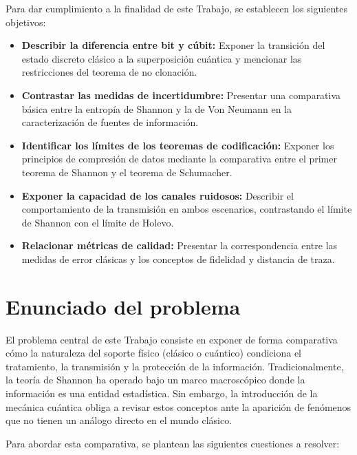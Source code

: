 \documentclass[11pt,a4paper,spanish]{book}
\begin{document}
Para dar cumplimiento a la finalidad de este Trabajo, se establecen los siguientes objetivos:

\begin{itemize}
    \item \textbf{Describir la diferencia entre bit y cúbit:} Exponer la transición del estado discreto clásico a la superposición cuántica y mencionar las restricciones del teorema de no clonación.
    \item \textbf{Contrastar las medidas de incertidumbre:} Presentar una comparativa básica entre la entropía de Shannon y la de Von Neumann en la caracterización de fuentes de información.
    \item \textbf{Identificar los límites de los teoremas de codificación:} Exponer los principios de compresión de datos mediante la comparativa entre el primer teorema de Shannon y el teorema de Schumacher.
    \item \textbf{Exponer la capacidad de los canales ruidosos:} Describir el comportamiento de la transmisión en ambos escenarios, contrastando el límite de Shannon con el límite de Holevo.
    \item \textbf{Relacionar métricas de calidad:} Presentar la correspondencia entre las medidas de error clásicas y los conceptos de fidelidad y distancia de traza.
\end{itemize}

\chapter{Enunciado del problema}

El problema central de este Trabajo consiste en exponer de forma comparativa cómo la naturaleza del soporte físico (clásico o cuántico) condiciona el tratamiento, la transmisión y la protección de la información. Tradicionalmente, la teoría de Shannon ha operado bajo un marco macroscópico donde la información es una entidad estadística. Sin embargo, la introducción de la mecánica cuántica obliga a revisar estos conceptos ante la aparición de fenómenos que no tienen un análogo directo en el mundo clásico.

Para abordar esta comparativa, se plantean las siguientes cuestiones a resolver:
\end{document}
